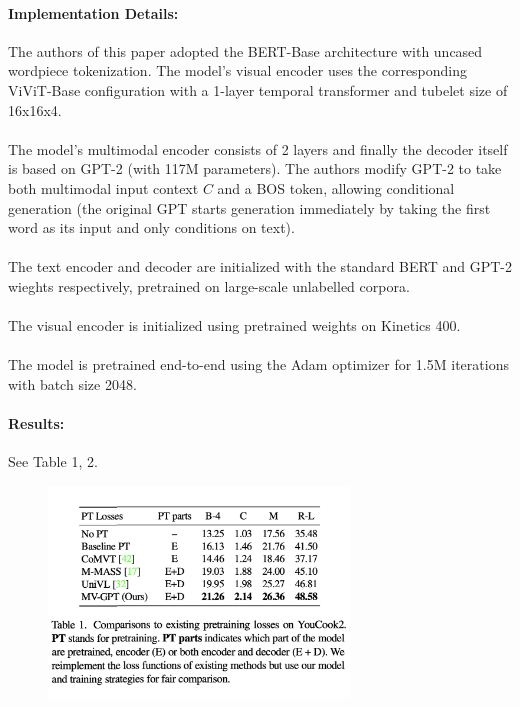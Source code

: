 \documentclass{article}
\begin{document}
\paragraph{Implementation Details:}The authors of this paper adopted the BERT-Base architecture
with uncased wordpiece tokenization. The model's visual encoder uses the corresponding 
ViViT-Base configuration with a 1-layer temporal transformer and tubelet size of 16x16x4.

\paragraph{}The model's multimodal encoder consists of 2 layers and finally the decoder itself
is based on GPT-2 (with 117M parameters). The authors modify GPT-2 to take both multimodal
input context $C$ and a BOS token, allowing conditional generation (the original GPT starts
generation immediately by taking the first word as its input and only conditions on text).

\paragraph{}The text encoder and decoder are initialized with the standard BERT and GPT-2 wieghts
respectively, pretrained on large-scale unlabelled corpora.

\paragraph{}The visual encoder is initialized using pretrained weights on Kinetics 400.

\paragraph{}The model is pretrained end-to-end using the Adam optimizer for 1.5M iterations with
batch size 2048. 

\paragraph{Results:} See Table 1, 2.

\begin{figure}
\includegraphics[width=8cm]{fig2}
\centering
\end{figure}
\end{document}
